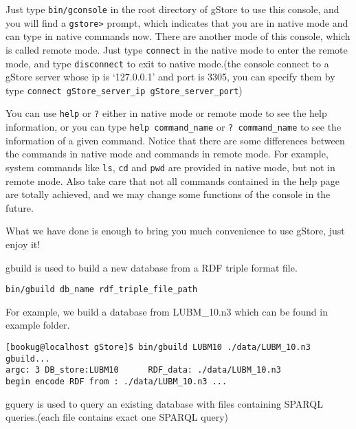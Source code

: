 \documentclass[titlepage, a4paper, 12pt]{article}
\begin{document}
Just type \texttt{bin/gconsole} in the root directory of gStore to use this console, and you will find a \texttt{gstore\textgreater{}} prompt, which indicates that you are in native mode and can type in native commands now. There are another mode of this console, which is called remote mode. Just type \texttt{connect} in the native mode to enter the remote mode, and type \texttt{disconnect} to exit to native mode.(the console connect to a gStore server whose ip is `127.0.0.1' and port is 3305, you can specify them by type \texttt{connect\ gStore\_server\_ip\ gStore\_server\_port})

You can use \texttt{help} or \texttt{?} either in native mode or remote mode to see the help information, or you can type \texttt{help\ command\_name} or \texttt{?\ command\_name} to see the information of a given command. Notice that there are some differences between the commands in native mode and commands in remote mode. For example, system commands like \texttt{ls}, \texttt{cd} and \texttt{pwd} are provided in native mode, but not in remote mode. Also take care that not all commands contained in the help page are totally achieved, and we may change some functions of the console in the future.

What we have done is enough to bring you much convenience to use gStore, just enjoy it!


gbuild is used to build a new database from a RDF triple format file.

\texttt{bin/gbuild\ db\_name\ rdf\_triple\_file\_path}

For example, we build a database from LUBM\_10.n3 which can be found in
example folder.

\begin{verbatim}
[bookug@localhost gStore]$ bin/gbuild LUBM10 ./data/LUBM_10.n3
gbuild...
argc: 3 DB_store:LUBM10      RDF_data: ./data/LUBM_10.n3
begin encode RDF from : ./data/LUBM_10.n3 ...
\end{verbatim}


gquery is used to query an existing database with files containing
SPARQL queries.(each file contains exact one SPARQL query)
\end{document}
